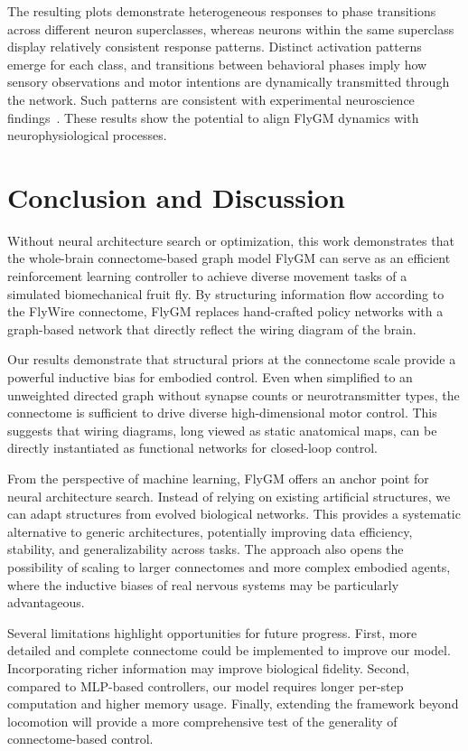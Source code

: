 \documentclass{article}
\theoremstyle{plain}
\theoremstyle{definition}
\theoremstyle{remark}
\begin{document}
The resulting plots demonstrate heterogeneous responses to phase transitions across different neuron superclasses, whereas neurons within the same superclass display relatively consistent response patterns. Distinct activation patterns emerge for each class, and transitions between behavioral phases imply how sensory observations and motor intentions are dynamically transmitted through the network. Such patterns are consistent with experimental neuroscience findings~\citep{Brezovec2024,schaffer2023spatial}. These results show the potential to align FlyGM dynamics with neurophysiological processes.

\section{Conclusion and Discussion}

Without neural architecture search or optimization, this work demonstrates that the whole-brain connectome-based graph model FlyGM can serve as an efficient reinforcement learning controller to achieve diverse movement tasks of a simulated biomechanical fruit fly. By structuring information flow according to the FlyWire connectome, FlyGM replaces hand-crafted policy networks with a graph-based network that directly reflect the wiring diagram of the brain.

Our results demonstrate that structural priors at the connectome scale provide a powerful inductive bias for embodied control. Even when simplified to an unweighted directed graph without synapse counts or neurotransmitter types, the connectome is sufficient to drive diverse high-dimensional motor control. This suggests that wiring diagrams, long viewed as static anatomical maps, can be directly instantiated as functional networks for closed-loop control.

From the perspective of machine learning, FlyGM offers an anchor point for neural architecture search. Instead of relying on existing artificial structures, we can adapt structures from evolved biological networks. This provides a systematic alternative to generic architectures, potentially improving data efficiency, stability, and generalizability across tasks. The approach also opens the possibility of scaling to larger connectomes and more complex embodied agents, where the inductive biases of real nervous systems may be particularly advantageous.

Several limitations highlight opportunities for future progress. First, more detailed and complete connectome could be implemented to improve our model. Incorporating richer information may improve biological fidelity. Second, compared to MLP-based controllers, our model requires longer per-step computation and higher memory usage. Finally, extending the framework beyond locomotion will provide a more comprehensive test of the generality of connectome-based control.
\end{document}
